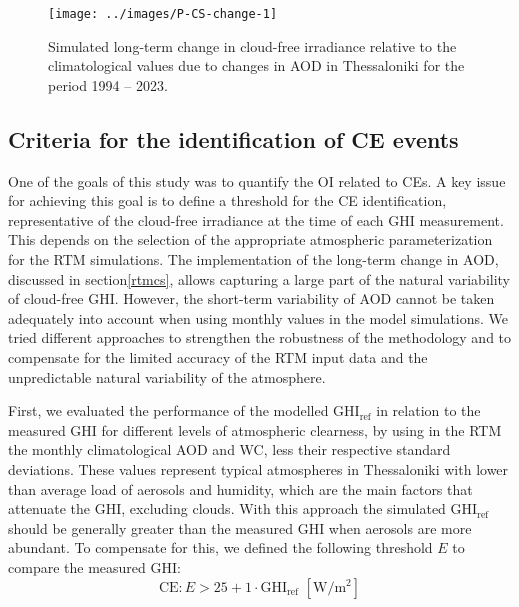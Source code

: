\documentclass[preprint, 5p,
authoryear]{elsarticle} %
\begin{document}
\begin{figure}

{\centering \texttt{[image: ../images/P-CS-change-1]} 

}

\caption{Simulated long-term change in cloud-free irradiance relative to the climatological values due to changes in AOD in Thessaloniki for the period 1994 -- 2023.}\label{fig:CS-change}
\end{figure}

\hypertarget{criteria-for-the-identification-of-ce-events}{%
\subsection{Criteria for the identification of CE
events}\label{criteria-for-the-identification-of-ce-events}}

One of the goals of this study was to quantify the OI related to CEs. A
key issue for achieving this goal is to define a threshold for the CE
identification, representative of the cloud-free irradiance at the time
of each GHI measurement. This depends on the selection of the
appropriate atmospheric parameterization for the RTM simulations. The
implementation of the long-term change in AOD, discussed in
section\nobreakspace{}\ref{rtmcs}, allows capturing a large part of the
natural variability of cloud-free GHI. However, the short-term
variability of AOD cannot be taken adequately into account when using
monthly values in the model simulations. We tried different approaches
to strengthen the robustness of the methodology and to compensate for
the limited accuracy of the RTM input data and the unpredictable natural
variability of the atmosphere.

First, we evaluated the performance of the modelled
\(\text{GHI}_\text{ref}\) in relation to the measured GHI for different
levels of atmospheric clearness, by using in the RTM the monthly
climatological AOD and WC, less their respective standard deviations.
These values represent typical atmospheres in Thessaloniki with lower
than average load of aerosols and humidity, which are the main factors
that attenuate the GHI, excluding clouds. With this approach the
simulated \(\text{GHI}_\text{ref}\) should be generally greater than the
measured GHI when aerosols are more abundant. To compensate for this, we
defined the following threshold \(E\) to compare the measured
\(\text{GHI}\): \begin{equation}
\text{CE} : E > 25 + 1 \cdot \text{GHI}_\text{ref} \,\,[\text{W}/\text{m}^2] \label{eq:CE4}
\end{equation}
\end{document}
